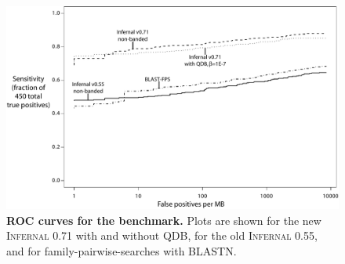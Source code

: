 \begin{figure}
\begin{center}
\includegraphics[width=6.4in,angle=0]{figs/roc}
\end{center}
\caption{\textbf{ROC curves for the benchmark.}  Plots are shown for
the new \textsc{Infernal} 0.71 with and without QDB, for the old
\textsc{Infernal 0.55}, and for family-pairwise-searches with BLASTN.
}
\label{fig:roc}
\end{figure}
